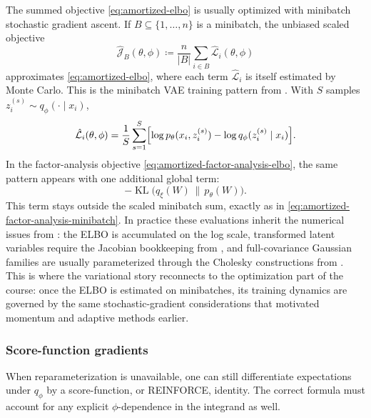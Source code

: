 The summed objective \eqref{eq:amortized-elbo} is usually optimized with minibatch stochastic gradient ascent.
If $B\subseteq\{1,\dots,n\}$ is a minibatch, the unbiased scaled objective
\begin{equation}
  \hat{\mathcal{J}}_B(\theta,\phi)
  \coloneqq
  \frac{n}{|B|}
  \sum_{i\in B}
  \hat{\mathcal{L}}_i(\theta,\phi)
  \label{eq:minibatch-elbo}
\end{equation}
approximates \eqref{eq:amortized-elbo}, where each term $\hat{\mathcal{L}}_i$ is itself estimated by Monte Carlo.
This is the minibatch VAE training pattern from \citet[\S2.3]{kingma_welling_2014_aevb}.
With $S$ samples $z_i^{(s)}\sim q_\phi(\cdot\mid x_i)$,
\begin{equation}
  \hat{\mathcal{L}}_i(\theta,\phi)
  =
  \frac{1}{S}
  \sum_{s=1}^S
  \Bigl[
    \log p_\theta(x_i,z_i^{(s)})
    -
    \log q_\phi(z_i^{(s)}\mid x_i)
  \Bigr].
  \label{eq:mc-elbo}
\end{equation}
In the factor-analysis objective \eqref{eq:amortized-factor-analysis-elbo}, the same pattern appears with one additional global term:
\[
  -\operatorname{KL}\!\bigl(q_\xi(W)\,\|\,p_\theta(W)\bigr).
\]
This term stays outside the scaled minibatch sum, exactly as in \eqref{eq:amortized-factor-analysis-minibatch}.
In practice these evaluations inherit the numerical issues from :
the ELBO is accumulated on the log scale, transformed latent variables require the Jacobian bookkeeping from , and full-covariance Gaussian families are usually parameterized through the Cholesky constructions from .
This is where the variational story reconnects to the optimization part of the course: once the ELBO is estimated on minibatches, its training dynamics are governed by the same stochastic-gradient considerations that motivated momentum and adaptive methods earlier.

\subsubsection{Score-function gradients}

When reparameterization is unavailable, one can still differentiate expectations under \(q_\phi\) by a score-function, or REINFORCE, identity.
The correct formula must account for any explicit \(\phi\)-dependence in the integrand as well.

